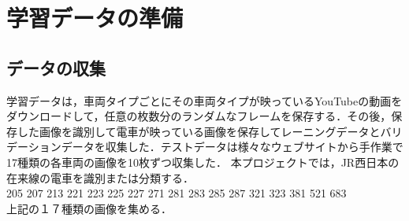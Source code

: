 

\chapter{学習データの準備}\label{genri}

\section{データの収集}
学習データは，車両タイプごとにその車両タイプが映っているYouTubeの動画をダウンロードして，任意の枚数分のランダムなフレームを保存する．その後，保存した画像を識別して電車が映っている画像を保存してレーニングデータとバリデーションデータを収集した．テストデータは様々なウェブサイトから手作業で17種類の各車両の画像を10枚ずつ収集した．
本プロジェクトでは，JR西日本の在来線の電車を識別または分類する．\\
205  207  213  221  223  225  227  271  281  283  285  287  321  323  381  521  683 \\
上記の１７種類の画像を集める．

